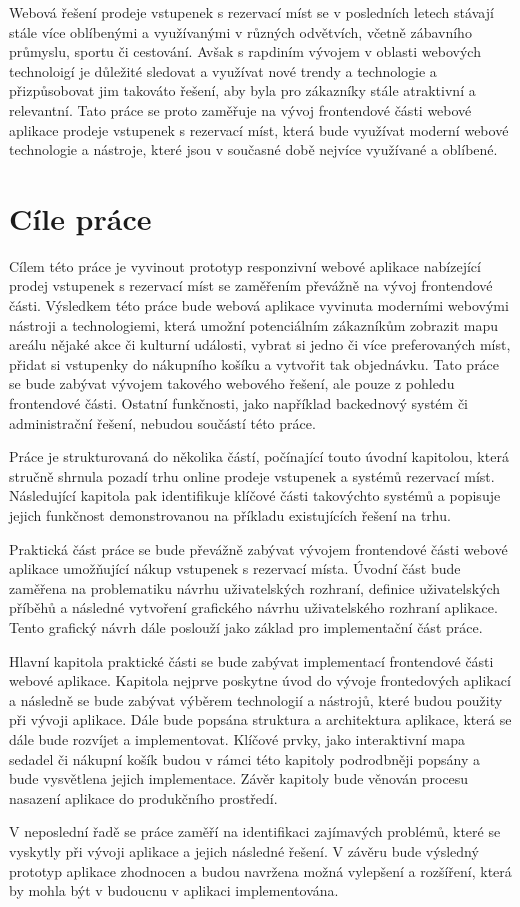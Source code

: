 Webová řešení prodeje vstupenek s rezervací míst se v posledních letech stávají stále více oblíbenými a využívanými v různých odvětvích, včetně zábavního průmyslu, sportu či cestování.
Avšak s rapdiním vývojem v oblasti webových technoloigí je důležité sledovat a využívat nové trendy a technologie a přizpůsobovat jim takováto řešení, aby byla pro zákazníky stále atraktivní a relevantní.
Tato práce se proto zaměřuje na vývoj frontendové části webové aplikace prodeje vstupenek s rezervací míst, která bude využívat moderní webové technologie a nástroje, které jsou v současné době nejvíce využívané a oblíbené.

\section*{Cíle práce}
\label{sec:uvod-cile-prace}
Cílem této práce je vyvinout prototyp responzivní webové aplikace nabízející prodej vstupenek s rezervací míst se zaměřením převážně na vývoj frontendové části.
Výsledkem této práce bude webová aplikace vyvinuta moderními webovými nástroji a technologiemi, která umožní potenciálním zákazníkům zobrazit mapu areálu nějaké akce či kulturní události, vybrat si jedno či více preferovaných míst, přidat si vstupenky do nákupního košíku a vytvořit tak objednávku.
Tato práce se bude zabývat vývojem takového webového řešení, ale pouze z pohledu frontendové části.
Ostatní funkčnosti, jako například backednový systém či administrační řešení, nebudou součástí této práce.

Práce je strukturovaná do několika částí, počínající touto úvodní kapitolou, která stručně shrnula pozadí trhu online prodeje vstupenek a systémů rezervací míst.
Následující kapitola pak identifikuje klíčové části takovýchto systémů a popisuje jejich funkčnost demonstrovanou na příkladu existujících řešení na trhu.

Praktická část práce se bude převážně zabývat vývojem frontendové části webové aplikace umožňující nákup vstupenek s rezervací místa.
Úvodní část bude zaměřena na problematiku návrhu uživatelských rozhraní, definice uživatelských příběhů a následné vytvoření grafického návrhu uživatelského rozhraní aplikace.
Tento grafický návrh dále poslouží jako základ pro implementační část práce.

Hlavní kapitola praktické části se bude zabývat implementací frontendové části webové aplikace.
Kapitola nejprve poskytne úvod do vývoje frontedových aplikací a následně se bude zabývat výběrem technologií a nástrojů, které budou použity při vývoji aplikace.
Dále bude popsána struktura a architektura aplikace, která se dále bude rozvíjet a implementovat.
Klíčové prvky, jako interaktivní mapa sedadel či nákupní košík budou v rámci této kapitoly podrodbněji popsány a bude vysvětlena jejich implementace.
Závěr kapitoly bude věnován procesu nasazení aplikace do produkčního prostředí.

V neposlední řadě se práce zaměří na identifikaci zajímavých problémů, které se vyskytly při vývoji aplikace a jejich následné řešení.
V závěru bude výsledný prototyp aplikace zhodnocen a budou navržena možná vylepšení a rozšíření, která by mohla být v budoucnu v aplikaci implementována.
